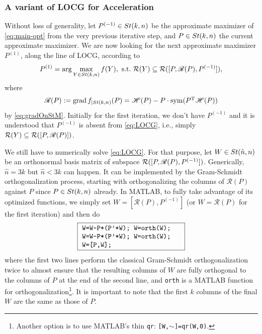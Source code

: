 \documentclass[11pt]{article}
\def\scrH{\mathscr{H}}
\def\scrR{\mathscr{R}}
\def\cR{{\cal R}}
\newcommand\STM[2]{{\rm St}(#1,#2)}
\DeclareMathOperator{\grad}{grad}
\DeclareMathOperator{\sym}{sym}
\DeclareMathOperator{\T}{T}
\def\scrR{\mathscr{R}}
\theoremstyle{definition}
\numberwithin{equation}{section}
\begin{document}
\subsubsection*{A variant of LOCG for Acceleration}
Without loss of generality, let $P^{(-1)}\in\STM{k}{n}$ be the approximate maximizer of \eqref{eq:main-opt}
from the very previous iterative step, and $P\in\STM{k}{n}$ the current approximate maximizer.
We are now looking for the next approximate maximizer
$P^{(1)}$, along the line of LOCG, according to
\begin{equation}\label{eq:LOCG}
P^{(1)}=\arg\max_{Y\in\STM{k}{n}}f(Y),\,\,\mbox{s.t.}\,\, \cR(Y)\subseteq\cR([P,\scrR(P),P^{(-1)}]),
\end{equation}
where
\begin{equation}\label{eq:R(P)}
\scrR(P):=\grad f_{|{\STM{k}{n}}}(P)=\scrH(P)-P\cdot\sym(P^{\T}\scrH(P)) %
\end{equation}
by \eqref{eq:gradOnStM}.
Initially for the first iteration, we don't have $P^{(-1)}$ and
it is understood that $P^{(-1)}$ is absent from \eqref{eq:LOCG}, i.e.,
simply $\cR(Y)\subseteq\cR([P,\scrR(P)])$.

We still have to numerically solve \eqref{eq:LOCG}. For that purpose, let $W\in\STM{\hat n}{n}$ be an orthonormal basis matrix of subspace
$\cR([P,\scrR(P),P^{(-1)}])$. Generically, $\hat n=3k$ but $\hat n<3k$ can happen.
It can be implemented by the Gram-Schmidt orthogonalization process, starting with orthogonalizing the columns of $\scrR(P)$ against $P$ since
$P\in\STM{k}{n}$ already. In MATLAB, to fully take advantage of its optimized functions, we simply set
$W=[\scrR(P),P^{(-1)}]$ (or $W=\scrR(P)$ for the first iteration) and then  do
$$
\framebox{
\begin{minipage}{4.9cm}
\tt  W=W-P*(P'*W); W=orth(W); \\
\tt W=W-P*(P'*W); W=orth(W);\\
\tt W=[P,W];
\end{minipage}
}
$$
where the first two lines  perform the classical Gram-Schmidt orthogonalization twice to almost ensure that
the resulting  columns of $W$ are fully orthogonal to the columns of $P$ at the end of the second line,
and {\tt orth} is a MATLAB function for
orthogonalization\footnote{Another option is to use MATLAB's thin {\tt qr}:
    {\tt [W,$\sim$]=qr(W,0)}.
    }.
It is important to note that the first $k$ columns of
the final $W$ are the same as those of $P$.
\end{document}
